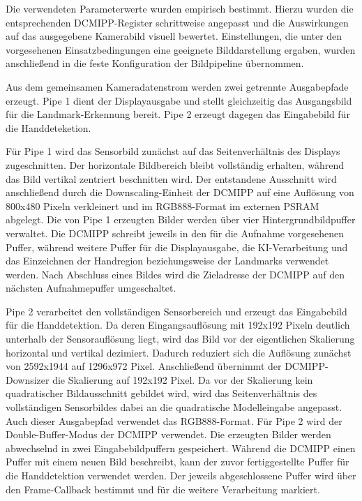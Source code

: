 Die verwendeten Parameterwerte wurden empirisch bestimmt. Hierzu wurden die entsprechenden DCMIPP-Register schrittweise angepasst und die Auswirkungen auf das ausgegebene Kamerabild visuell bewertet. Einstellungen, die unter den vorgesehenen Einsatzbedingungen eine geeignete Bilddarstellung ergaben, wurden anschließend in die feste Konfiguration der Bildpipeline übernommen.

Aus dem gemeinsamen Kameradatenstrom werden zwei getrennte Ausgabepfade erzeugt. Pipe 1 dient der Displayausgabe und stellt gleichzeitig das Ausgangsbild für die Landmark-Erkennung bereit. Pipe 2 erzeugt dagegen das Eingabebild für die Handdeteketion.

Für Pipe 1 wird das Sensorbild zunächst auf das Seitenverhältnis des Displays zugeschnitten. Der horizontale Bildbereich bleibt vollständig erhalten, während das Bild vertikal zentriert beschnitten wird. Der entstandene Ausschnitt wird anschließend durch die Downscaling-Einheit der DCMIPP auf eine Auflösung von 800x480 Pixeln verkleinert und im RGB888-Format im externen PSRAM abgelegt. Die von Pipe 1 erzeugten Bilder werden über vier Hintergrundbildpuffer verwaltet. Die DCMIPP schreibt jeweils in den für die Aufnahme vorgesehenen Puffer, während weitere Puffer für die Displayausgabe, die KI-Verarbeitung und das Einzeichnen der Handregion beziehungsweise der Landmarks verwendet werden. Nach Abschluss eines Bildes wird die Zieladresse der DCMIPP auf den nächsten Aufnahmepuffer umgeschaltet.

Pipe 2 verarbeitet den vollständigen Sensorbereich und erzeugt das Eingabebild für die Handdetektion. Da deren Eingangsauflösung mit 192x192 Pixeln deutlich unterhalb der Sensorauflösung liegt, wird das Bild vor der eigentlichen Skalierung horizontal und vertikal dezimiert. Dadurch reduziert sich die Auflösung zunächst von 2592x1944 auf 1296x972 Pixel. Anschließend übernimmt der DCMIPP-Downsizer die Skalierung auf 192x192 Pixel. Da vor der Skalierung kein quadratischer Bildausschnitt gebildet wird, wird das Seitenverhältnis des vollständigen Sensorbildes dabei an die quadratische Modelleingabe angepasst. Auch dieser Ausgabepfad verwendet das RGB888-Format. Für Pipe 2 wird der Double-Buffer-Modus der DCMIPP verwendet. Die erzeugten Bilder werden abwechselnd in zwei Eingabebildpuffern gespeichert. Während die DCMIPP einen Puffer mit einem neuen Bild beschreibt, kann der zuvor fertiggestellte Puffer für die Handdetektion verwendet werden. Der jeweils abgeschlossene Puffer wird über den Frame-Callback bestimmt und für die weitere Verarbeitung markiert.


